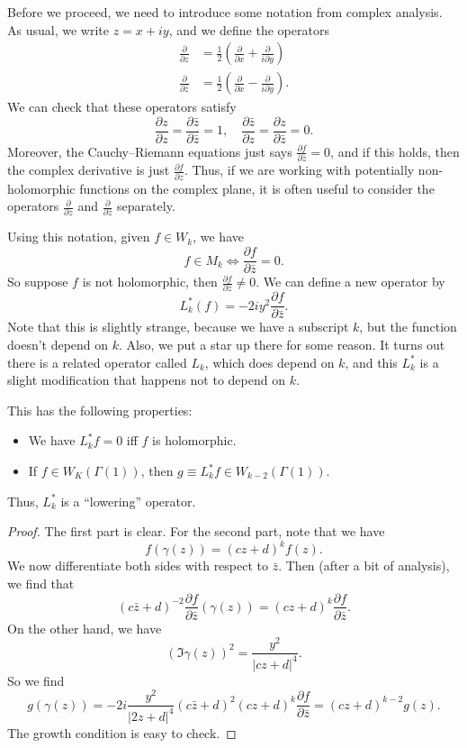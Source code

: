 \documentclass[a4paper]{article}
\begin{document}
Before we proceed, we need to introduce some notation from complex analysis. As usual, we write $z = x + iy$, and we define the operators
\begin{align*}
  \frac{\partial}{\partial z} &= \frac{1}{2} \left(\frac{\partial}{\partial x} + \frac{\partial}{i \partial y}\right)\\
  \frac{\partial}{\partial \bar{z}} &= \frac{1}{2} \left(\frac{\partial}{\partial x} - \frac{\partial}{i \partial y}\right).
\end{align*}
We can check that these operators satisfy
\[
  \frac{\partial z}{\partial z} = \frac{\partial \bar{z}}{\partial \bar{z}} = 1,\quad \frac{\partial \bar{z}}{\partial z} = \frac{\partial z}{\partial \bar{z}} = 0.
\]
Moreover, the Cauchy--Riemann equations just says $\frac{\partial f}{\partial \bar{z}} = 0$, and if this holds, then the complex derivative is just $\frac{\partial f}{\partial z}$. Thus, if we are working with potentially non-holomorphic functions on the complex plane, it is often useful to consider the operators $\frac{\partial}{\partial z}$ and $\frac{\partial}{\partial \bar{z}}$ separately.

Using this notation, given $f \in W_k$, we have
\[
  f \in M_k \Longleftrightarrow \frac{\partial f}{\partial \bar{z}} = 0.
\]
So suppose $f$ is not holomorphic, then $\frac{\partial f}{\partial \bar{z}} \not= 0$. We can define a new operator by
\[
  L_k^* (f) = -2i y^2 \frac{\partial f}{\partial \bar{z}}.
\]
Note that this is slightly strange, because we have a subscript $k$, but the function doesn't depend on $k$. Also, we put a star up there for some reason. It turns out there is a related operator called $L_k$, which does depend on $k$, and this $L_k^*$ is a slight modification that happens not to depend on $k$.

This has the following properties:

\begin{prop}\leavevmode
  \begin{itemize}
    \item We have $L_k^* f = 0$ iff $f$ is holomorphic.
    \item If $f \in W_K(\Gamma(1))$, then $g \equiv L_k^* f \in W_{k - 2} (\Gamma(1))$.
  \end{itemize}
\end{prop}
Thus, $L_k^*$ is a ``lowering'' operator.

\begin{proof}
  The first part is clear. For the second part, note that we have
  \[
    f(\gamma(z)) = (cz + d)^k f(z).
  \]
  We now differentiate both sides with respect to $\bar{z}$. Then (after a bit of analysis), we find that
  \[
    (c\bar{z} + d)^{-2} \frac{\partial f}{\partial \bar{z}} (\gamma(z)) = (cz + d)^k \frac{\partial f}{\partial \bar{z}}.
  \]
  On the other hand, we have
  \[
    (\Im \gamma(z))^2 = \frac{y^2}{|cz + d|^4}.
  \]
  So we find
  \[
    g(\gamma(z)) = -2i \frac{y^2}{|2z + d|^4} (c \bar{z} + d)^2 (cz + d)^k \frac{\partial f}{\partial \bar{z}} = (cz + d)^{k - 2} g(z).
  \]
  The growth condition is easy to check.
\end{proof}
\end{document}
